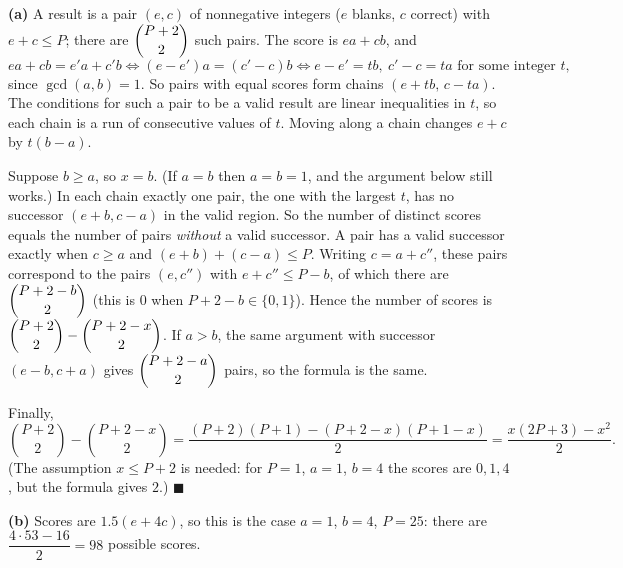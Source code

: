 \textbf{(a)} A result is a pair $(e,c)$ of nonnegative integers ($e$ blanks, $c$ correct) with $e+c\le P$; there are $\dbinom{P+2}{2}$ such pairs. The score is $ea+cb$, and
\[ea+cb=e'a+c'b\iff\left(e-e'\right)a=\left(c'-c\right)b\iff e-e'=tb,\ c'-c=ta\text{ for some integer }t,\]
since $\gcd(a,b)=1$. So pairs with equal scores form chains $(e+tb,\,c-ta)$. The conditions for such a pair to be a valid result are linear inequalities in $t$, so each chain is a run of consecutive values of $t$. Moving along a chain changes $e+c$ by $t(b-a)$.

Suppose $b\ge a$, so $x=b$. (If $a=b$ then $a=b=1$, and the argument below still works.) In each chain exactly one pair, the one with the largest $t$, has no successor $(e+b,c-a)$ in the valid region. So the number of distinct scores equals the number of pairs \emph{without} a valid successor. A pair has a valid successor exactly when $c\ge a$ and $(e+b)+(c-a)\le P$. Writing $c=a+c''$, these pairs correspond to the pairs $(e,c'')$ with $e+c''\le P-b$, of which there are $\dbinom{P+2-b}{2}$ (this is $0$ when $P+2-b\in\{0,1\}$). Hence the number of scores is $\dbinom{P+2}{2}-\dbinom{P+2-x}{2}$. If $a>b$, the same argument with successor $(e-b,c+a)$ gives $\dbinom{P+2-a}{2}$ pairs, so the formula is the same.

Finally,
\[\binom{P+2}{2}-\binom{P+2-x}{2}=\dfrac{(P+2)(P+1)-(P+2-x)(P+1-x)}{2}=\dfrac{x(2P+3)-x^2}{2}.\]
(The assumption $x\le P+2$ is needed: for $P=1$, $a=1$, $b=4$ the scores are $0,1,4$, but the formula gives $2$.) $\blacksquare$

\textbf{(b)} Scores are $1.5(e+4c)$, so this is the case $a=1$, $b=4$, $P=25$: there are $\dfrac{4\cdot53-16}{2}=\boxed{98}$ possible scores.
